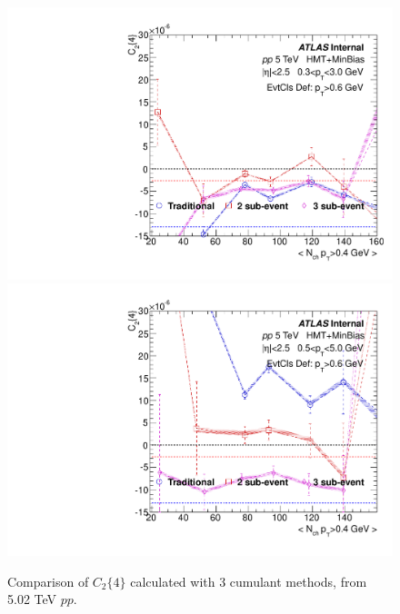 \begin{figure}[p]
\includegraphics[width=0.4\linewidth]{figs/sec_result/pp5/phy_4PC_Har0_Pt0_Cls3.pdf}
\includegraphics[width=0.4\linewidth]{figs/sec_result/pp5/phy_4PC_Har0_Pt1_Cls3.pdf}
\caption{Comparison of $C_{2}\{4\}$ calculated with 3 cumulant methods, from 5.02 TeV $pp$.}
\label{fig:result_pp5_C24}
\end{figure}
\clearpage

